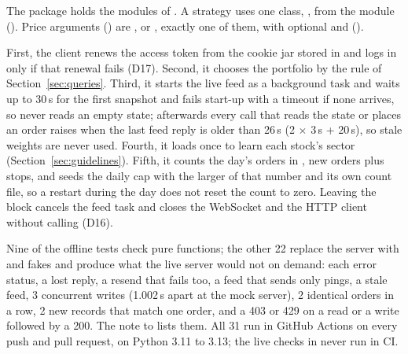 \seclabel
{}

 The package  holds the modules of . A strategy uses one class, , from the  module (). Price arguments () are ,  or , exactly one of them, with optional  and  ().



 First, the client renews the access token from the cookie jar stored in  and logs in only if that renewal fails (D17). Second, it chooses the portfolio by the rule of Section~\ref{sec:queries}. Third, it starts the live feed as a background task and waits up to 30\,s for the first snapshot and fails start-up with a timeout if none arrives, so  never reads an empty state; afterwards every call that reads the state or places an order raises  when the last feed reply is older than 26\,s (2 $\times$ 3\,s + 20\,s), so stale weights are never used. Fourth, it loads  once to learn each stock's sector (Section~\ref{sec:guidelines}). Fifth, it counts the day's orders in , new orders plus stops, and seeds the daily cap with the larger of that number and its own count file, so a restart during the day does not reset the count to zero. Leaving the block cancels the feed task and closes the WebSocket and the HTTP client without calling  (D16).

 Nine of the offline tests check pure functions; the other 22 replace the server with  and fakes and produce what the live server would not on demand: each error status, a lost  reply, a resend that fails too, a feed that sends only pings, a stale feed, 3 concurrent writes (1.002\,s apart at the mock server), 2 identical orders in a row, 2 new records that match one order, and a 403 or 429 on a read or a write followed by a 200. The note to  lists them. All 31 run in GitHub Actions on every push and pull request, on Python 3.11 to 3.13; the live checks in  never run in CI.

